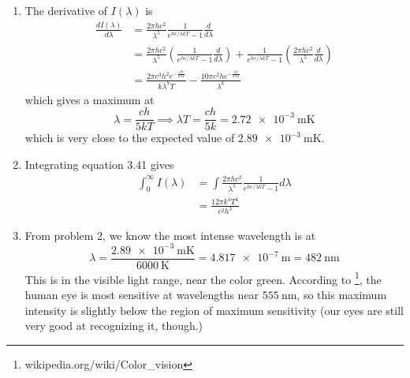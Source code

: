 \documentclass[fleqn]{article}[12pt]
\begin{document}
\begin{enumerate}
    \item The derivative of $I(\lambda)$ is
    \begin{align*}
        \frac{dI(\lambda)}{d\lambda} &= \frac{2\pi h c^2}{\lambda^5}\frac{1}{e^{hc/\lambda k T} - 1} \frac{d}{d\lambda} \\
        &= \frac{2\pi h c^2}{\lambda^5}\left(\frac{1}{e^{hc/\lambda k T} - 1}\frac{d}{d\lambda}\right) +
        \frac{1}{e^{hc/\lambda k T} - 1} \left(\frac{2\pi h c^2}{\lambda^5}\frac{d}{d\lambda}\right) \\
        &= \frac{2 \pi  c^3 h^2 e^{-\frac{c h}{k \lambda  T}}}{k \lambda ^7 T}-\frac{10 \pi  c^2 h e^{-\frac{c h}{k \lambda  T}}}{\lambda ^6}
    \end{align*}
    which gives a maximum at
    \begin{equation*}
        \lambda = \frac{c h}{5 k T} \implies \lambda T = \frac{c h}{5 k} = \SI{2.72e-3}{\m\kelvin}
    \end{equation*}
    which is very close to the expected value of $\SI{2.89e-3}{\m\kelvin}$.

    \item Integrating equation  3.41 gives
    \begin{align*}
        \int_0^\infty I(\lambda) &= \int \frac{2\pi h c^2}{\lambda^5} \frac{1}{e^{hc/\lambda k T} - 1} d \lambda \\
        &= \frac{12 \pi  k^4 T^4}{c^2 h^3}
    \end{align*}

    \item From problem 2, we know the most intense wavelength is at
    \begin{equation*}
        \lambda = \frac{\SI{2.89e-3}{\m\kelvin}}{\SI{6000}{\kelvin}} = \SI{4.817e-7}{\meter} = \SI{482}{\nano\meter}
    \end{equation*}
    This is in the visible light range, near the color green. According to \footnote{wikipedia.org/wiki/Color\_vision}, the human eye is most sensitive at wavelengths near $\SI{555}{\nano\meter}$, so this maximum intensity is slightly below the region of maximum sensitivity (our eyes are still very good at recognizing it, though.)
\end{enumerate}
\end{document}
